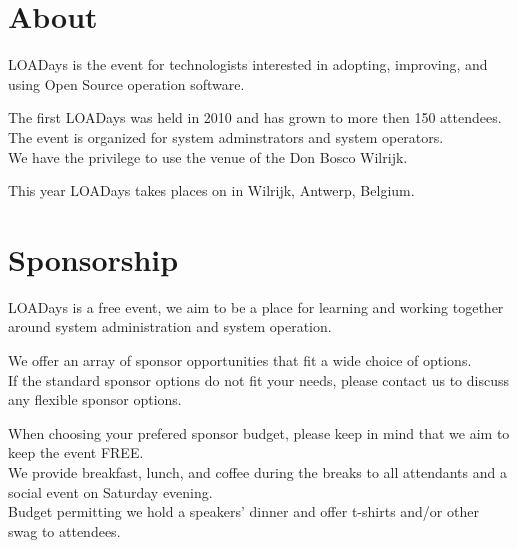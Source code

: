 
\section{About}

LOADays is the event for technologists interested in adopting, improving, and using Open Source operation software.\\
\par

The first LOADays was held in 2010 and has grown to more then 150 attendees.\\
The event is organized for system adminstrators and system operators.\\
We have the privilege to use the venue of the Don Bosco Wilrijk.\\
\par

This year LOADays takes places on \textbf{\confdates} in Wilrijk, Antwerp, Belgium.
\par

\section{Sponsorship}

LOADays is a free event, we aim to be a place for learning and working together around system administration and system operation.
\par

We offer an array of sponsor opportunities that fit a wide choice of options.\\
If the standard sponsor options do not fit your needs, please contact us to discuss any flexible sponsor options.
\par

When choosing your prefered sponsor budget, please keep in mind that we aim to keep the event FREE.\\
We provide breakfast, lunch, and coffee during the breaks to all attendants and a social event on Saturday evening.\\
Budget permitting we hold a speakers' dinner and offer t-shirts and/or other swag to attendees.
\par



